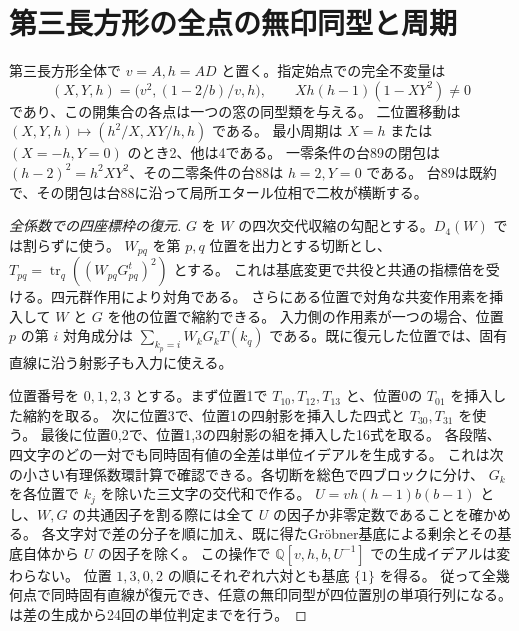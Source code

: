 \section{第三長方形の全点の無印同型と周期}
\label{sec:third-rectangle-orbits}
\begin{theorem}\label{thm:third-rectangle-orbits}
第三長方形全体で $v=A,h=AD$ と置く。指定始点での完全不変量は
\[
 (X,Y,h)=\bigl(v^2,(1-2/b)/v,h\bigr),\qquad Xh(h-1)(1-XY^2)\ne0
\]
であり、この開集合の各点は一つの窓の同型類を与える。
二位置移動は $(X,Y,h)\mapsto(h^2/X,XY/h,h)$ である。
最小周期は $X=h$ または $(X=-h,Y=0)$ のとき2、他は4である。
一零条件の台89の閉包は $(h-2)^2=h^2XY^2$、その二零条件の台88は $h=2,Y=0$ である。
台89は既約で、その閉包は台88に沿って局所エタール位相で二枚が横断する。
\end{theorem}
\begin{proof}[全係数での四座標枠の復元]
$G$ を $W$ の四次交代収縮の勾配とする。$D_4(W)$ では割らずに使う。
$W_{pq}$ を第 $p,q$ 位置を出力とする切断とし、
$T_{pq}=\operatorname{tr}_q((W_{pq}G_{pq}^t)^2)$ とする。
これは基底変更で共役と共通の指標倍を受ける。四元群作用により対角である。
さらにある位置で対角な共変作用素を挿入して $W$ と $G$ を他の位置で縮約できる。
入力側の作用素が一つの場合、位置 $p$ の第 $i$ 対角成分は
$\sum_{k_p=i}W_kG_k T(k_q)$ である。既に復元した位置では、固有直線に沿う射影子も入力に使える。

位置番号を $0,1,2,3$ とする。まず位置1で $T_{10},T_{12},T_{13}$ と、位置0の $T_{01}$ を挿入した縮約を取る。
次に位置3で、位置1の四射影を挿入した四式と $T_{30},T_{31}$ を使う。
最後に位置0,2で、位置1,3の四射影の組を挿入した16式を取る。
各段階、四文字のどの一対でも同時固有値の全差は単位イデアルを生成する。
これは次の小さい有理係数環計算で確認できる。各切断を総色で四ブロックに分け、
$G_k$ を各位置で $k_j$ を除いた三文字の交代和で作る。
$U=vh(h-1)b(b-1)$ とし、$W,G$ の共通因子を割る際には全て $U$ の因子か非零定数であることを確かめる。
各文字対で差の分子を順に加え、既に得たGröbner基底による剰余とその基底自体から $U$ の因子を除く。
この操作で $\mathbb Q[v,h,b,U^{-1}]$ での生成イデアルは変わらない。
位置 $1,3,0,2$ の順にそれぞれ六対とも基底 $\{1\}$ を得る。
従って全幾何点で同時固有直線が復元でき、任意の無印同型が四位置別の単項行列になる。
 は差の生成から24回の単位判定までを行う。
\end{proof}

